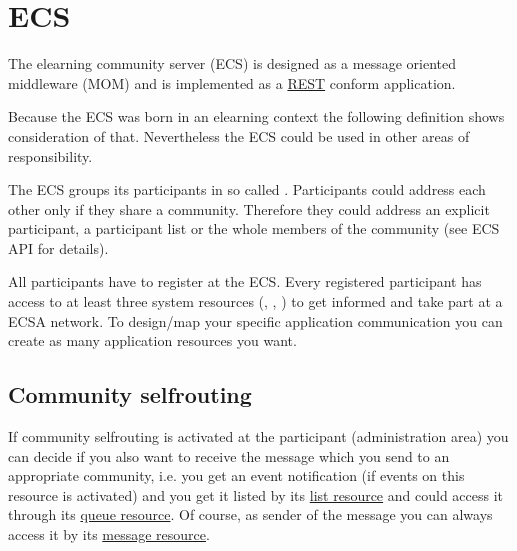 \chapter{ECS}
The elearning community server (ECS) is designed as a message oriented
middleware (MOM) and is implemented as a
\href{http://en.wikipedia.org/wiki/REST}{REST} conform application.

Because the ECS was born in an elearning context the following definition shows
consideration of that. Nevertheless the ECS could be used in other areas of
responsibility.

The ECS groups its participants in so called . Participants
could address each other only if they share a community. Therefore they could
address an explicit participant, a participant list or the whole members of the
community (see ECS API for details).

All participants have to register at the ECS. Every registered participant has
access to at least three system resources (,
, ) to get informed and take part at a ECSA
network. To design/map your specific application communication you can create as many
application resources you want.

\hypertarget{selfrouting}{}
\section{Community selfrouting}%
%
If community selfrouting is activated at the participant (administration area)
you can decide if you also want to receive the message which you send to an
appropriate community, i.e. you get an event notification (if events on this
resource is activated) and you get it listed by its
\href{https://ecs.uni-stuttgart.de/ecsa-wiki/HeikoBernloehr/FreeLancer/ECS/ecs2/core#list-ressource}{list
resource} and could access it through its
\href{https://ecs.uni-stuttgart.de/ecsa-wiki/HeikoBernloehr/FreeLancer/ECS/ecs2/core#queue-ressource}{queue
resource}. Of course, as sender of the message you can always access it by its
\href{https://ecs.uni-stuttgart.de/ecsa-wiki/HeikoBernloehr/FreeLancer/ECS/ecs2/core#message-resource}{message
resource}. 

\hypertarget{authentication}{}
